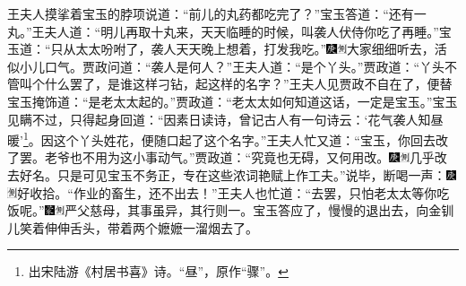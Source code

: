 王夫人摸挲着宝玉的脖项说道：“前儿的丸药都吃完了？”宝玉答道：“还有一丸。”王夫人道：“明儿再取十丸来，天天临睡的时候，叫袭人伏侍你吃了再睡。”宝玉道：“只从太太吩咐了，袭人天天晚上想着，打发我吃。”{\includegraphics[width=3mm]{../Images/00004}\includegraphics[width=3mm]{../Images/00011}\footnotesize \kaishu 大家细细听去，活似小儿口气。}贾政问道：“袭人是何人？”王夫人道：“是个丫头。”贾政道：“丫头不管叫个什么罢了，是谁这样刁钻，起这样的名字？”王夫人见贾政不自在了，便替宝玉掩饰道：“是老太太起的。”贾政道：“老太太如何知道这话，一定是宝玉。”宝玉见瞒不过，只得起身回道：“因素日读诗，曾记古人有一句诗云：‘花气袭人知昼暖’\footnote{出宋陆游《村居书喜》诗。“昼”，原作“骤”。}。因这个丫头姓花，便随口起了这个名字。”王夫人忙又道：“宝玉，你回去改了罢。老爷也不用为这小事动气。”贾政道：“究竟也无碍，又何用改。{\includegraphics[width=3mm]{../Images/00004}\includegraphics[width=3mm]{../Images/00011}\footnotesize \kaishu 几乎改去好名。}只是可见宝玉不务正，专在这些浓词艳赋上作工夫。”说毕，断喝一声：{\includegraphics[width=3mm]{../Images/00004}\includegraphics[width=3mm]{../Images/00011}\footnotesize \kaishu 好收拾。}“作业的畜生，还不出去！”王夫人也忙道：“去罢，只怕老太太等你吃饭呢。”{\includegraphics[width=3mm]{../Images/00006}\includegraphics[width=3mm]{../Images/00011}\footnotesize \kaishu 严父慈母，其事虽异，其行则一。}宝玉答应了，慢慢的退出去，向金钏儿笑着伸伸舌头，带着两个嬷嬷一溜烟去了。


